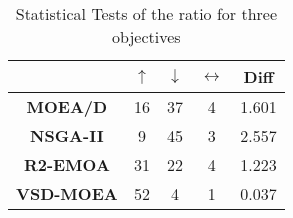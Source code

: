 \begin{table}[t]
\caption{Statistical Tests of the ratio \HV{} for three objectives}
\label{tab:Tests_HV_3obj}
\centering
\begin{tabular}{c c|c|c|c}
\cline{2-5}
                                        & \textbf{$\uparrow$} & \textbf{$\downarrow$} & \textbf{$\leftrightarrow$} & \textbf{Diff} \\ \hline
\multicolumn{1}{c|}{\textbf{MOEA/D}}   & 16                  & 37                    & 4                          & 1.601         \\ \hline
\multicolumn{1}{c|}{\textbf{NSGA-II}}  & 9                   & 45                    & 3                          & 2.557         \\ \hline
\multicolumn{1}{c|}{\textbf{R2-EMOA}}  & 31                  & 22                    & 4                          & 1.223         \\ \hline
\multicolumn{1}{c|}{\textbf{VSD-MOEA}} & 52                  & 4                     & 1                          & 0.037         \\ \hline
\end{tabular}%
\end{table}

%
